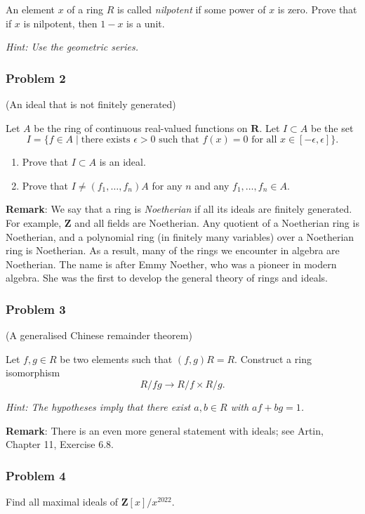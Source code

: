 \documentclass[11pt]{article}
\begin{document}
An element \(x\) of a ring \(R\) is called \emph{nilpotent} if some power of \(x\) is zero.
Prove that if \(x\) is nilpotent, then \(1-x\) is a unit.

\emph{Hint: Use the geometric series.}

\subsubsection*{Problem 2}
\label{sec:orgcd65075}
(An ideal that is not finitely generated)

Let \(A\) be the ring of continuous real-valued functions on \(\mathbf{R}\).
Let \(I \subset A\) be the set
\[I = \{f \in A \mid \text{there exists } \epsilon > 0 \text{ such that } f(x) = 0 \text{ for all } x \in [-\epsilon, \epsilon]\}.\]
\begin{enumerate}
\item Prove that \(I \subset A\) is an ideal.
\item Prove that \(I \neq (f_1,\dots, f_{n})A\) for any \(n\) and any \(f_1, \dots, f_n \in A\).
\end{enumerate}

\textbf{\textbf{Remark}}: We say that a ring is \emph{Noetherian} if all its ideals are finitely generated.  For example, \(\mathbf{Z}\) and all fields are Noetherian.
Any quotient of a Noetherian ring is Noetherian, and a polynomial ring (in finitely many variables) over a Noetherian ring is Noetherian.
As a result, many of the rings we encounter in algebra are Noetherian.
The name is after Emmy Noether, who was a pioneer in modern algebra.
She was the first to develop the general theory of rings and ideals.


\subsubsection*{Problem 3}
\label{sec:orgb8f0320}
(A generalised Chinese remainder theorem)

Let \(f, g \in R\) be two elements such that \((f,g)R = R\).
Construct a ring isomorphism
\[ R/fg \to R/f \times R/g.\]

\emph{Hint: The hypotheses imply that there exist \(a,b \in R\) with \(af+bg = 1\).}

\textbf{\textbf{Remark}}: There is an even more general statement with ideals; see Artin, Chapter 11, Exercise 6.8.


\subsubsection*{Problem 4}
\label{sec:org3dd129e}
Find all maximal ideals of \(\mathbf{Z}[x]/x^{2022}\).
\end{document}
